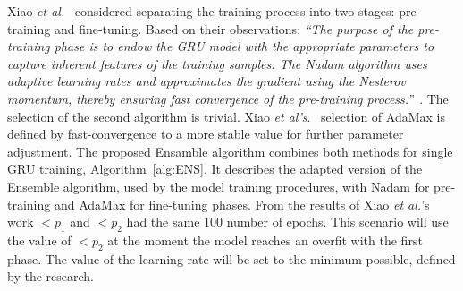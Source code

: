 %
%
Xiao \textit{et al.}~\cite{xiao_accurate_2019} considered separating the training process into two stages: pre-training and fine-tuning.
Based on their observations: \textit{``The purpose of the pre-training phase is to endow the GRU model with the appropriate parameters to capture inherent features of the training samples.
The Nadam algorithm uses adaptive learning rates and approximates the gradient using the Nesterov momentum, thereby ensuring fast convergence of the pre-training process.''}~\cite[p.~54195]{xiao_accurate_2019}.
The selection of the second algorithm is trivial.
Xiao \textit{et al's}.~\cite{xiao_accurate_2019} selection of AdaMax is defined by fast-convergence to a more stable value for further parameter adjustment.
The proposed Ensamble algorithm combines both methods for single GRU training, \mbox{Algorithm~\ref{alg:ENS}}.
It describes the adapted version of the Ensemble algorithm, used by the model training procedures, with Nadam for pre-training and AdaMax for fine-tuning phases.
From the results of Xiao \textit{et al.}'s~\cite{xiao_accurate_2019} work $<p_{1}$ and $<p_{2}$ had the same 100 number of epochs.
This scenario will use the value of $<p_{2}$ at the moment the model reaches an overfit with the first phase.
The value of the learning rate will be set to the minimum possible, defined by the research.
